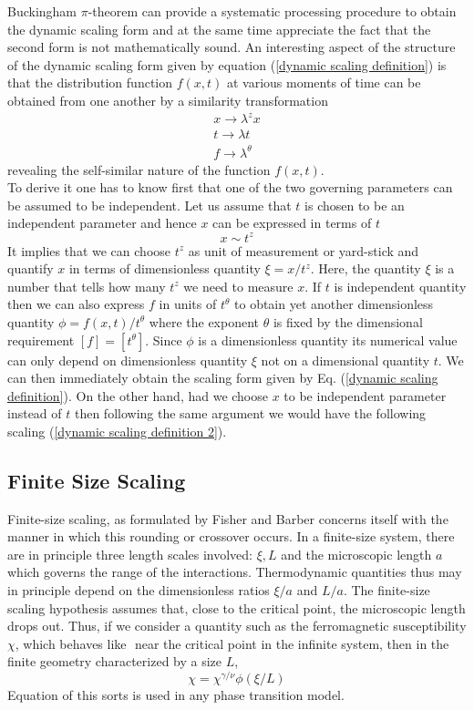 	Buckingham $\pi$-theorem can provide a systematic processing procedure to obtain the dynamic scaling form and at the same time appreciate the fact that the second form is not mathematically sound. An interesting aspect of the structure of the dynamic scaling form given by equation (\ref{dynamic scaling definition}) is that the distribution function $f(x,t)$ at various moments of time can be obtained from one another by a similarity transformation
	\begin{align}
		x \rightarrow \lambda^z x \\
		t \rightarrow \lambda t \\
		f \rightarrow \lambda^\theta
	\end{align}
	revealing the self-similar nature of the function $f(x,t)$.\\
	
	To derive it one has to know first that one of the two governing parameters can be assumed to be independent. Let us assume that $t$ is	chosen to be an independent parameter and hence $x$ can be expressed	in terms of $t$
	\begin{equation}
	x \sim t^z
	\end{equation}
	It implies that we can choose $t^z$ as unit of measurement or yard-stick and quantify $x$ in terms of dimensionless quantity $\xi=x/t^z$. Here, the	quantity $\xi$ is a number that tells how many $t^z$ we need to measure $x$.	If $t$ is independent quantity then we can also express $f$ in units of $t^\theta$	to obtain yet another dimensionless quantity $\phi = f (x, t)/t^\theta$ where the	exponent $\theta$ is fixed by the dimensional requirement $\left[f\right] = \left[t^\theta\right]$. Since $\phi$ is a dimensionless quantity its numerical value can only depend on dimensionless quantity $\xi$ not on a dimensional quantity $t$. We	can then immediately obtain the scaling form given by Eq. (\ref{dynamic scaling definition}). On	the other hand, had we choose $x$ to be independent parameter instead of	$t$ then following the same argument we would have the following scaling (\ref{dynamic scaling definition 2}).
	
	
	\subsection{Finite Size Scaling}
	\label{subsect:FSS}
	Finite-size scaling, as formulated by Fisher and Barber \cite{Fisher1972}	concerns itself with the manner in which this rounding or crossover occurs. In a finite-size	system, there are in principle three length scales involved: $\xi, L$ and the microscopic length $a$	which governs the range of the interactions. Thermodynamic quantities thus may in principle	depend on the dimensionless ratios $\xi/a$ and $L/a$. The finite-size scaling hypothesis assumes	that, close to the critical point, the microscopic length drops out. Thus, if we consider a	quantity such as the ferromagnetic susceptibility $\chi$, which behaves like $ $ near the critical	point in the infinite system, then in the finite geometry characterized by a size $L$,
	\begin{equation}
		\chi = \chi^{\gamma/\nu} \phi(\xi/L)
	\end{equation}
	Equation of this sorts is used in any phase transition model.
	
